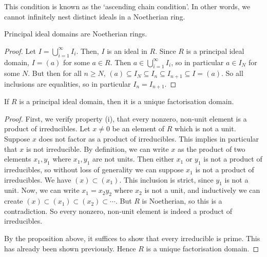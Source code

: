 This condition is known as the `ascending chain condition'.
In other words, we cannot infinitely nest distinct ideals in a Noetherian ring.
\begin{lemma}
	Principal ideal domains are Noetherian rings.
\end{lemma}
\begin{proof}
	Let \( I = \bigcup_{i=1}^\infty I_i \).
	Then, \( I \) is an ideal in \( R \).
	Since \( R \) is a principal ideal domain, \( I = (a) \) for some \( a \in R \).
	Then \( a \in \bigcup_{i=1}^\infty I_i \), so in particular \( a \in I_N \) for some \( N \).
	But then for all \( n \geq N \), \( (a) \subseteq I_N \subseteq I_{n} \subseteq I_{n+1} \subseteq I = (a) \).
	So all inclusions are equalities, so in particular \( I_n = I_{n+1} \).
\end{proof}
\begin{theorem}
	If \( R \) is a principal ideal domain, then it is a unique factorisation domain.
\end{theorem}
\begin{proof}
	First, we verify property (i), that every nonzero, non-unit element is a product of irreducibles.
	Let \( x \neq 0 \) be an element of \( R \) which is not a unit.
	Suppose \( x \) does not factor as a product of irreducibles.
	This implies in particular that \( x \) is not irreducible.
	By definition, we can write \( x \) as the product of two elements \( x_1, y_1 \) where \( x_1, y_1 \) are not units.
	Then either \( x_1 \) or \( y_1 \) is not a product of irreducibles, so without loss of generality we can suppose \( x_1 \) is not a product of irreducibles.
	We have \( (x) \subset (x_1) \).
	This inclusion is strict, since \( y_1 \) is not a unit.
	Now, we can write \( x_1 = x_2 y_2 \) where \( x_2 \) is not a unit, and inductively we can create \( (x) \subset (x_1) \subset (x_2) \subset \cdots \).
	But \( R \) is Noetherian, so this is a contradiction.
	So every nonzero, non-unit element is indeed a product of irreducibles.

	By the proposition above, it suffices to show that every irreducible is prime.
	This has already been shown previously.
	Hence \( R \) is a unique factorisation domain.
\end{proof}
